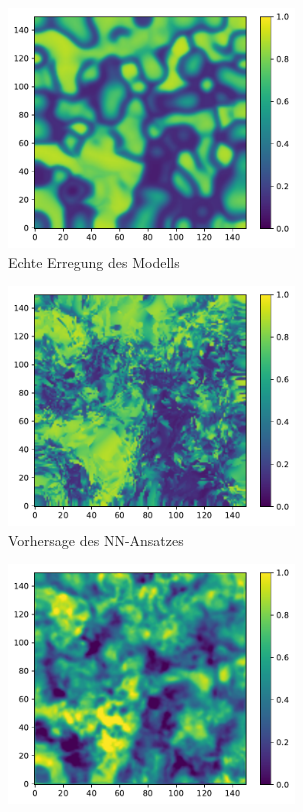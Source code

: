 \begin{appendices}
\begin{figure}[h]
	\centering
	\begin{subfigure}{.5\textwidth}
		\centering
		\includegraphics[height=2.5in]{figures/results/unblur/mitchell_v_blur_orig.pdf}
		\setcapmargin[1cm]{0.5cm}
		\caption{Echte Erregung des Modells}
		\label{fig:apx_unblur_mitchell_result_orig}
	\end{subfigure}%
	\begin{subfigure}{.5\textwidth}
		\centering
		\includegraphics[height=2.5in]{figures/results/unblur/nn_mitchell_v_blur_pred.pdf}
		\setcapmargin[1cm]{0.5cm}
  		\caption{Vorhersage des \textsc{NN}-Ansatzes}
  		\label{fig:apx_unblur_mitchell_result_nn_pred}
	\end{subfigure}
	\begin{subfigure}{.5\textwidth}
		\centering
		\includegraphics[height=2.5in]{figures/results/unblur/rbf_mitchell_v_blur_pred.pdf}

\end{subfigure}
\end{figure}
\end{appendices}
